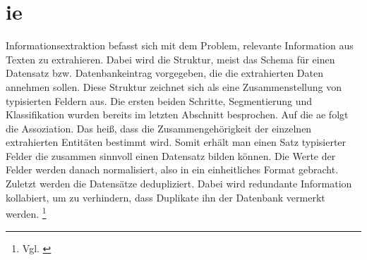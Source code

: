 \section{\acrlong{ie}}
Informationsextraktion befasst sich mit dem Problem, relevante Information aus Texten zu extrahieren. 
Dabei wird die Struktur, meist das Schema für einen Datensatz bzw.  Datenbankeintrag vorgegeben, die die extrahierten Daten annehmen sollen.
Diese Struktur zeichnet sich als eine Zusammenstellung von typisierten Feldern aus.
Die ersten beiden Schritte, Segmentierung und Klassifikation wurden bereits im letzten Abschnitt besprochen.
Auf die \gls{ae} folgt die Assoziation. Das heiß, dass die Zusammengehörigkeit der einzelnen extrahierten Entitäten bestimmt wird.
Somit erhält man einen Satz typisierter Felder die zusammen sinnvoll einen Datensatz bilden können.
Die Werte der Felder werden danach normalisiert, also in ein einheitliches Format gebracht.
Zuletzt werden die Datensätze dedupliziert. Dabei wird redundante Information kollabiert, um zu verhindern, dass Duplikate ihn der Datenbank vermerkt werden.
\footnote{Vgl. \cite{mccallum2005information}}




